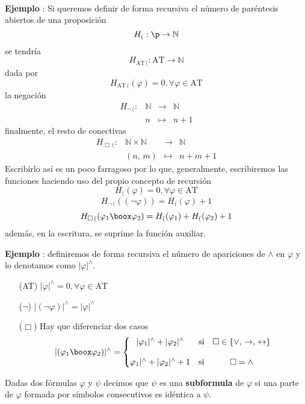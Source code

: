 \paragraph{}
\addtocounter{ej}{1} %
\textbf{Ejemplo }: Si queremos definir de forma recursiva el número de paréntesis abiertos de una proposición
\[ H_{(}: \p \rightarrow \mathbb{N} \] 
se tendría
\[ H_{\mbox{AT}\,(}: \mbox{AT} \rightarrow \mathbb{N} \]
dada por
\[ H_{\mbox{AT}\,(}(\varphi)=0, \forall \varphi \in \mbox{AT} \]
la negación
\[ \begin{matrix}
 H_{\lnot \,(}: & \mathbb{N} & \rightarrow & \mathbb{N}\\
 &n& \longmapsto &  n+1
\end{matrix} \] 
finalmente, el resto de conectivas 
\[ \begin{matrix}
 H_{\Box \,(} :  & \mathbb{N} \times \mathbb{N} & \rightarrow & \mathbb{N}\\
 &(n,\, m)& \longmapsto &  n+m+1
\end{matrix} \] 
Escribirlo así es un poco farragoso por lo que, generalmente, escribiremos las funciones haciendo uso del propio concepto de recursión
\[ H_{(}(\varphi)=0, \forall \varphi \in \mbox{AT} \]
\[ H_{\lnot \,(}((\neg \varphi))=H_{(}(\varphi) +1 \]
\[ H_{\Box \,(}(\varphi_1 \boox \varphi_2)= H_{(}(\varphi_1)+H_{(}(\varphi_2)+1 \]
además, en la escritura, se suprime la función auxiliar. 
\addtocounter{ej}{1} %
\textbf{Ejemplo }: definiremos de forma recursiva el número de apariciones de $\wedge$ en $\varphi$ y lo denotamos como $\vert \varphi \vert^{\wedge}$.
\begin{itemize}
	\item[(AT)] $\vert \varphi \vert^{\wedge}=0, \forall \varphi \in \mbox{AT}$
	\item[($\neg$)] $\vert (\neg \varphi) \vert^{\wedge}=\vert \varphi \vert^{\wedge}$
	\item[($\Box$)] Hay que diferenciar dos casos
	\[ \vert (\varphi_1 \boox \varphi_2) \vert^{\wedge}= \left\lbrace \begin{matrix}
	\vert \varphi_1 \vert^{\wedge}+\vert \varphi_2 \vert^{\wedge}& \mbox{si}& \Box \in \{ \lor, \, \rightarrow, \, \leftrightarrow\}\\
	\\
	\varphi_1 \vert^{\wedge}+\vert \varphi_2 \vert^{\wedge}+1 & \mbox{si}& \Box=\wedge
\end{matrix} \right.	 \] 
\end{itemize}
\begin{definition} Dadas dos fórmulas $\varphi$ y $\psi$ decimos que $\psi$ es una \textbf{subformula} de $\varphi$ si una parte de $\varphi$ formada por símbolos consecutivos es idéntica a $\psi$.
\end{definition}
